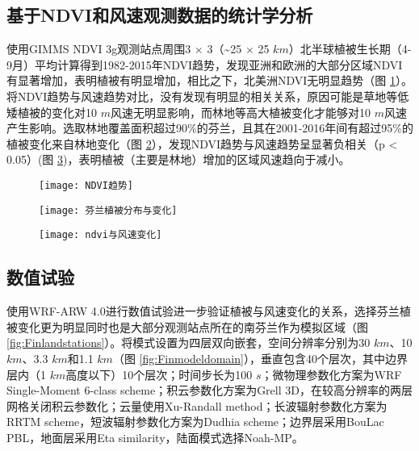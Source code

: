 \subsection{基于NDVI和风速观测数据的统计学分析}

使用GIMMS NDVI 3g观测站点周围3 $ \times$ 3（\textasciitilde 25 $\times$ 25 $km$）北半球植被生长期（4-9月）平均计算得到1982-2015年NDVI趋势，发现亚洲和欧洲的大部分区域NDVI有显著增加，表明植被有明显增加，相比之下，北美洲NDVI无明显趋势（图 \ref{fig:NDVItrend}）。将NDVI趋势与风速趋势对比，没有发现有明显的相关关系，原因可能是草地等低矮植被的变化对10 $m$风速无明显影响，而林地等高大植被变化才能够对10 $m$风速产生影响。选取林地覆盖面积超过90\%的芬兰，且其在2001-2016年间有超过95\%的植被变化来自林地变化（图 \ref{fig:Finlandvegetation}），发现NDVI趋势与风速趋势呈显著负相关（p < 0.05）(图 \ref{fig:FinlandwindvsNDVI})，表明植被（主要是林地）增加的区域风速趋向于减小。

\begin{figure}[!htbp]
    \centering
    \texttt{[image: NDVI趋势]}
        \label{fig:NDVItrend}
\end{figure}

\begin{figure}[!htbp]
    \centering
    \texttt{[image: 芬兰植被分布与变化]}
        \label{fig:Finlandvegetation}
\end{figure}

\begin{figure}[!t]
    \centering
    \texttt{[image: ndvi与风速变化]}
        \label{fig:FinlandwindvsNDVI}
\end{figure}

\subsection{数值试验}

使用WRF-ARW 4.0进行数值试验进一步验证植被与风速变化的关系，选择芬兰植被变化更为明显同时也是大部分观测站点所在的南芬兰作为模拟区域（图 \ref{fig:Finlandstations}）。将模式设置为四层双向嵌套，空间分辨率分别为30 $km$、10 $km$、3.3 $km$和1.1 $km$（图 \ref{fig:Finmodeldomain}），垂直包含40个层次，其中边界层内（1 $km$高度以下）10个层次；时间步长为100 $s$；微物理参数化方案为WRF Single-Moment 6-class scheme；积云参数化方案为Grell 3D，在较高分辨率的两层网格关闭积云参数化；云量使用Xu-Randall method；长波辐射参数化方案为RRTM scheme，短波辐射参数化方案为Dudhia scheme；边界层采用BouLac PBL，地面层采用Eta similarity，陆面模式选择Noah-MP。

